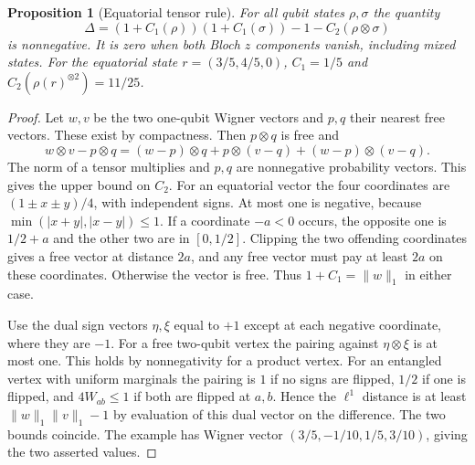 \documentclass[aps,pra,onecolumn,superscriptaddress,nofootinbib,10pt]{revtex4-2}
\newtheorem{proposition}[theorem]{Proposition}
\theoremstyle{definition}
\theoremstyle{remark}
\begin{document}
\begin{proposition}[Equatorial tensor rule]\label{ob:wignertensor}
For all qubit states \(\rho,\sigma\) the quantity
\[
 \Delta=(1+C_1(\rho))(1+C_1(\sigma))-1-C_2(\rho\otimes\sigma)
\]
is nonnegative. It is zero when both Bloch \(z\) components
vanish, including mixed states. For the equatorial state
\(r=(3/5,4/5,0)\), \(C_1=1/5\) and \(C_2(\rho(r)^{\otimes2})=11/25\).
\end{proposition}
\begin{proof}
Let \(w,v\) be the two one-qubit Wigner vectors and \(p,q\)
their nearest free vectors. These exist by compactness. Then
\(p\otimes q\) is free and
\[
 w\otimes v-p\otimes q=(w-p)\otimes q+p\otimes(v-q)
                     +(w-p)\otimes(v-q).
\]
The norm of a tensor multiplies and \(p,q\) are nonnegative
probability vectors. This gives the upper bound on \(C_2\).
For an equatorial vector the four coordinates are
\((1\pm x\pm y)/4\), with independent signs. At most one is
negative, because \(\min(|x+y|,|x-y|)\le1\).
If a coordinate \(-a<0\) occurs, the opposite one is \(1/2+a\)
and the other two are in \([0,1/2]\). Clipping the two offending
coordinates gives a free vector at distance \(2a\), and any free
vector must pay at least \(2a\) on these coordinates. Otherwise
the vector is free. Thus \(1+C_1=\|w\|_1\) in either case.

Use the dual sign vectors \(\eta,\xi\) equal to \(+1\) except
at each negative coordinate, where they are \(-1\). For a free
two-qubit vertex the pairing against \(\eta\otimes\xi\) is at
most one. This holds by nonnegativity for a product vertex.
For an entangled vertex with uniform marginals the pairing is
\(1\) if no signs are flipped, \(1/2\) if one is flipped, and
\(4W_{ab}\le1\) if both are flipped at \(a,b\).
Hence the \(\ell^1\) distance is at least
\(\|w\|_1\|v\|_1-1\) by evaluation of this dual vector on the
difference. The two bounds coincide. The example has Wigner vector
\((3/5,-1/10,1/5,3/10)\), giving the two asserted values.
\end{proof}
\end{document}
